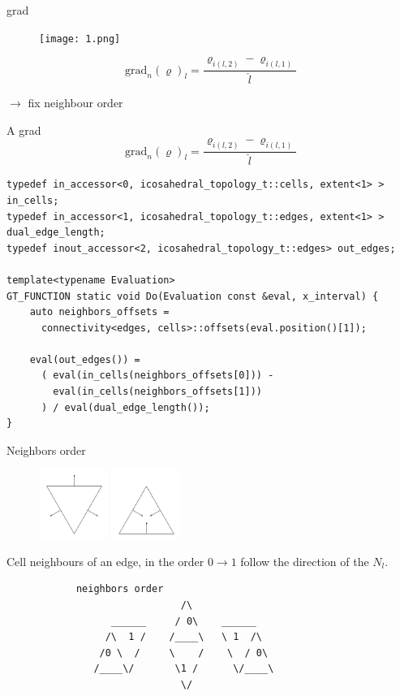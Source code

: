 \documentclass{beamer}
\begin{document}
\begin{frame}{grad}
  \begin{figure}[htbp]
  \centering
  \texttt{[image: 1.png]}
  \end{figure}
  \[\text{grad}_n(\varrho)_l = \frac{\varrho_{i(l,2)}-\varrho_{i(l,1)}}{\hat{l}}\]

  $\rightarrow$ fix neighbour order
\end{frame}

\begin{frame}[fragile]{A grad}
  \[\text{grad}_n(\varrho)_l = \frac{\varrho_{i(l,2)}-\varrho_{i(l,1)}}{\hat{l}}\]

  \begin{lstlisting}[basicstyle=\scriptsize\ttfamily]
typedef in_accessor<0, icosahedral_topology_t::cells, extent<1> > in_cells;
typedef in_accessor<1, icosahedral_topology_t::edges, extent<1> > dual_edge_length;
typedef inout_accessor<2, icosahedral_topology_t::edges> out_edges;

template<typename Evaluation>
GT_FUNCTION static void Do(Evaluation const &eval, x_interval) {
    auto neighbors_offsets =
      connectivity<edges, cells>::offsets(eval.position()[1]);

    eval(out_edges()) =
      ( eval(in_cells(neighbors_offsets[0])) -
        eval(in_cells(neighbors_offsets[1]))
      ) / eval(dual_edge_length());
}
  \end{lstlisting}
\end{frame}

\begin{frame}[fragile]{Neighbors order}
  \begin{figure}[htbp]
  \centering
  \includegraphics[width=0.2\textwidth]{flow_downward.pdf}
  \includegraphics[width=0.2\textwidth]{flow_upward.pdf}
  \end{figure}

  Cell neighbours of an edge, in the order $0 \rightarrow 1$ follow the direction of the $N_l$.
  \begin{lstlisting}
            neighbors order
                              /\
                  ______     / 0\    ______
                 /\  1 /    /____\   \ 1  /\
                /0 \  /     \    /    \  / 0\
               /____\/       \1 /      \/____\
                              \/
  \end{lstlisting}
\end{frame}
\end{document}

